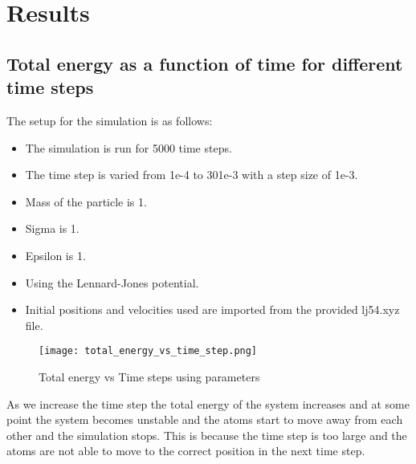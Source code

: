 \chapter{Results}\label{chap:results}

\section{Total energy as a function of time for different time steps}
    The setup for the simulation is as follows:
    \begin{itemize}
        \item The simulation is run for 5000 time steps.
        \item The time step is varied from 1e-4 to 301e-3 with a step size of 1e-3.
        \item Mass of the particle is 1.
        \item Sigma is 1.
        \item Epsilon is 1.
        \item Using the Lennard-Jones potential.
        \item Initial positions and velocities used are imported from the provided lj54.xyz file.
    \end{itemize}

    \graphicspath{ {./figures/milestone04/} }
    \begin{figure}[!htb]
    \centering
        \texttt{[image: total\_energy\_vs\_time\_step.png]}
        \caption{Total energy vs Time steps using parameters}
    \label{fig:total_energy_vs_time_step}
    \end{figure}
    As we increase the time step the total energy of the system increases and at some point the system becomes unstable and the atoms start to move away from each other
    and the simulation stops. This is because the time step is too large and the atoms are not able to move to the correct position in the next time step.


